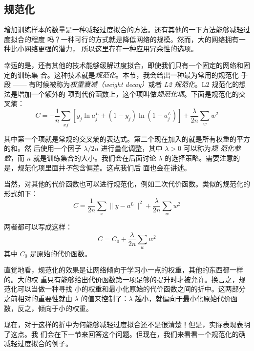 \subsection{规范化}

增加训练样本的数量是一种减轻过度拟合的方法。还有其他的一下方法能够减轻过度拟合的程度
吗？一种可行的方式就是降低网络的规模。然而，大的网络拥有一种比小网络更强的潜力，
所以这里存在一种应用冗余性的选项。

幸运的是，还有其他的技术能够缓解过度拟合，即使我们只有一个固定的网络和固定的训练集
合。这种技术就是\emph{规范化}。本节，我会给出一种最为常用的规范化
手段 —— 有时候被称为\emph{权重衰减（weight decay）}或者 \emph{L2 规范化}。L2 规范化的想法是增加一个额外的
项到代价函数上，这个项叫做\emph{规范化项}。下面是规范化的交叉熵：
\begin{equation}
  C = -\frac{1}{n} \sum_{xj} \left[ y_j \ln a^L_j+(1-y_j) \ln
  (1-a^L_j)\right] + \frac{\lambda}{2n} \sum_w w^2
\label{eq:85}\tag{85}
\end{equation}

其中第一个项就是常规的交叉熵的表达式。第二个现在加入的就是所有权重的平方的和。然
后使用一个因子 $\lambda / 2n$ 进行量化调整，其中 $\lambda > 0$ 可以称为\emph{规
  范化参数}，而 $n$ 就是训练集合的大小。我们会在后面讨论
$\lambda$ 的选择策略。需要注意的是，规范化项里面并\emph{不}包含偏差。这点我们后
面也会在讲述。

当然，对其他的代价函数也可以进行规范化，例如二次代价函数。类似的规范化的形式如下：
\begin{equation}
  C = \frac{1}{2n} \sum_x \|y-a^L\|^2 + \frac{\lambda}{2n} \sum_w w^2
  \label{eq:86}\tag{86}
\end{equation}

两者都可以写成这样：
\begin{equation}
  C = C_0 + \frac{\lambda}{2n} \sum_w w^2
  \label{eq:87}\tag{87}
\end{equation}
其中 $C_0$ 是原始的代价函数。

直觉地看，规范化的效果是让网络倾向于学习小一点的权重，其他的东西都一样的。大的权
重只有能够给出代价函数第一项足够的提升时才被允许。换言之，规范化可以当做一种寻找
小的权重和最小化原始的代价函数之间的折中。这两部分之前相对的重要性就由 $\lambda$
的值来控制了：$\lambda$ 越小，就偏向于最小化原始代价函数，反之，倾向于小的权重。

现在，对于这样的折中为何能够减轻过度拟合还不是很清楚！但是，实际表现表明了这点。我
们会在下一节来回答这个问题。但现在，我们来看看一个规范化的确减轻过度拟合的例子。

